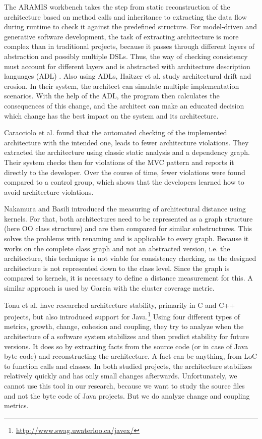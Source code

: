 \documentclass[sigplan, anonymous, review]{acmart}
\begin{document}
The ARAMIS workbench \cite{Aramis} takes the step from static reconstruction of the architecture based on method calls and inheritance to extracting the data flow during runtime to check it against the predefined structure. 
For model-driven and generative software development, the task of extracting architecture is more complex than in traditional projects, because it passes through different layers of abstraction and possibly multiple DSLs. 
Thus, the way of checking consistency must account for different layers and is abstracted with architecture description languages (ADL) \cite{ArcCons,Arc-MDSE}. 
Also using ADLs, Haitzer et al. \cite{Arc-Decision} study architectural drift and erosion. In their system, the architect can simulate multiple implementation scenarios. With the help of the ADL, the program then calculates the consequences of this change, and the architect can make an educated decision which change has the best impact on the system and its architecture. 

Caracciolo et al. \cite{ArcConf} found that the automated checking of the implemented architecture with the intended one, leads to fewer architecture violations. They extracted the architecture using classic static analysis and a dependency graph. Their system checks then for violations of the MVC pattern and reports it directly to the developer. Over the course of time, fewer violations were found compared to a control group, which shows that the developers learned how to avoid architecture violations.

Nakamura and Basili \cite{StructDist} introduced the measuring of architectural distance using kernels. For that, both architectures need to be represented as a graph structure (here OO class structure) and are then compared for similar substructures. This solves the problems with renaming and is applicable to every graph. 
Because it works on the complete class graph and not an abstracted version, i.e. the architecture, this technique is not viable for consistency checking, as the designed architecture is not represented down to the class level. 
Since the graph is compared to kernels, it is necessary to define a distance measurement for this. A similar approach is used by Garcia \cite{arcade-thesis} with the cluster coverage metric.

Tonu et al. \cite{Swag} have researched architecture stability, primarily in C and C++ projects, but also introduced support for Java.\footnote{\url{http://www.swag.uwaterloo.ca/javex/}} Using four different types of metrics, growth, change, cohesion and coupling, they try to analyze when the architecture of a software system stabilizes and then predict stability for future versions. It does so by extracting facts from the source code (or in case of Java byte code) and reconstructing the architecture. A fact can be anything, from LoC to function calls and classes. 
In both studied projects, the architecture stabilizes relatively quickly and has only small changes afterwards. Unfortunately, we cannot use this tool in our research, because we want to study the source files and not the byte code of Java projects. But we do analyze change and coupling metrics.
\end{document}
